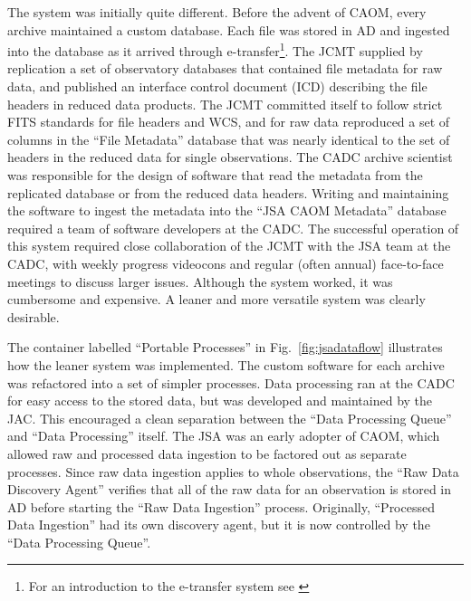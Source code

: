 \documentclass[final,authoryear,5p,times,twocolumn]{elsarticle}
\newcommand*\figref[1]{Fig.~\ref{#1}}
\begin{document}
The system was initially quite different.  Before the advent of CAOM, every archive maintained a custom database.  Each file was stored in AD and ingested into the database as it arrived through e-transfer\footnote{For an introduction to the e-transfer system see \citet{2005ASPC..347..647M}}.  The JCMT supplied by replication a set of observatory databases that contained file metadata for raw data, and published an interface control document (ICD) describing the file headers in reduced data products. The JCMT committed itself to follow strict FITS standards for file headers and WCS, and for raw data reproduced a set of columns in the ``File Metadata'' database that was nearly identical  to the set of headers in the reduced data for single observations.   The CADC archive scientist was responsible for the design of software that read the metadata from the replicated database or from the reduced data headers.  Writing and maintaining the software to ingest the metadata into the ``JSA CAOM Metadata'' database required a team of software developers at the CADC.  The successful operation of this system required close collaboration of the JCMT with the JSA team at the CADC, with weekly progress videocons and regular (often annual) face-to-face meetings to discuss larger issues.  Although the system worked, it was cumbersome and expensive.  A leaner and more versatile system was clearly desirable.

The container labelled ``Portable Processes'' in \figref{fig:jsadataflow} illustrates how the leaner system was implemented.  The custom software for each archive was refactored into a set of simpler processes.  Data processing ran at the CADC for easy access to the stored data, but was developed and maintained by the JAC.  This encouraged a clean separation between the ``Data Processing Queue'' and  ``Data Processing'' itself.    The JSA was an early adopter of CAOM, which allowed raw and processed data ingestion to be factored out as separate processes.  Since raw data ingestion applies to whole observations, the ``Raw Data Discovery Agent'' verifies that all of the raw data for an observation is stored in AD before starting the ``Raw Data Ingestion'' process.  Originally, ``Processed Data Ingestion'' had its own discovery agent, but it is now controlled by the ``Data Processing Queue''.
\end{document}
